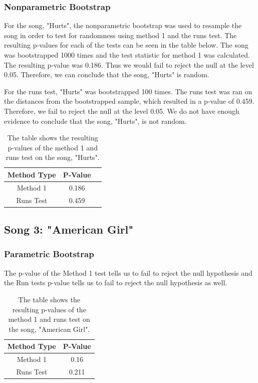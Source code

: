 \documentclass[12pt, letterpaper]{article}
\begin{document}
\subsubsection{Nonparametric Bootstrap}
For the song, "Hurts", the nonparametric bootstrap was used to resample the song in order to test for randomness using method 1 and the runs test. The resulting p-values for each of the tests can be seen in the table below. The song was bootstrapped 1000 times and the test statistic for method 1 was calculated. The resulting p-value was 0.186. Thus we would fail to reject the null at the level 0.05. Therefore, we can conclude that the song, "Hurts" is random. 

For the runs test, "Hurts" was bootstrapped 100 times. The runs test was ran on the distances from the bootstrapped sample, which resulted in a p-value of 0.459. Therefore, we fail to reject the null at the level 0.05. We do not have enough evidence to conclude that the song, "Hurts", is not random.
\begin{table}[h]
\begin{center}
\begin{tabular}{|c|c|c|}
\hline
\textbf{Method Type} & P-Value \\
\hline
Method 1 & 0.186  \\
\hline
Runs Test & 0.459 \\ 
\hline
\end{tabular}
\end{center}
\caption{The table shows the resulting p-values of the method 1 and runs test on the song, "Hurts".}
\label{fig: P-values for "Hurts": Nonparametric Bootstrap}
\end{table}

\subsection{Song 3: "American Girl"}
\subsubsection{Parametric Bootstrap}
The p-value of the Method 1 test tells us to fail to reject the null hypothesis and the Run tests p-value tells us to fail to reject the null hypothesis as well.
\begin{table}[h]
\begin{center}
\begin{tabular}{|c|c|}
\hline
\textbf{Method Type} & P-Value \\
\hline
Method 1 & 0.16 \\
\hline
Runs Test & 0.211 \\ 
\hline 
\end{tabular} 
\end{center}
\caption{The table shows the resulting p-values of the method 1 and runs test on the song, "American Girl".}
\label{fig: P-values for "American Girl": Parametric Bootstrap}
\end{table}
\end{document}
